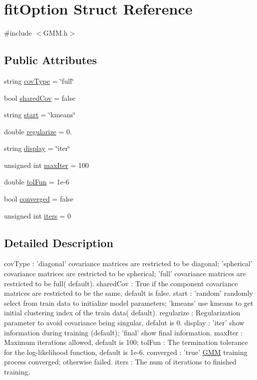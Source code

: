 \hypertarget{structfit_option}{\section{fit\+Option Struct Reference}
\label{structfit_option}
}


{\ttfamily \#include $<$G\+M\+M.\+h$>$}

\subsection*{Public Attributes}
\begin{DoxyCompactItemize}
\item 
string \hyperlink{structfit_option_ae1d880f6fcd26e15f07d50c77c5cceea}{cov\+Type} = \char`\"{}full\char`\"{}
\item 
bool \hyperlink{structfit_option_a2efaf3629539e3864967853058e80420}{shared\+Cov} = false
\item 
string \hyperlink{structfit_option_a4c1ecd5ba984e2e12faa29217c78f931}{start} = \char`\"{}kmeans\char`\"{}
\item 
double \hyperlink{structfit_option_abffa02537679becf07413b31f5889e6f}{regularize} = 0.
\item 
string \hyperlink{structfit_option_acd949efbbb51ddf447d4cb86fd2ac901}{display} = \char`\"{}iter\char`\"{}
\item 
unsigned int \hyperlink{structfit_option_a54d1906ece53c348047c8b404ff06053}{max\+Iter} = 100
\item 
double \hyperlink{structfit_option_a4523efadc5bc4f29cd1648ac4ca018dd}{tol\+Fun} = 1e-\/6
\item 
bool \hyperlink{structfit_option_a600d82e88e845abb5a442f80eecf89cb}{converged} = false
\item 
unsigned int \hyperlink{structfit_option_a711048d488fccee5740b31e4149c46de}{iters} = 0
\end{DoxyCompactItemize}


\subsection{Detailed Description}
cov\+Type \+: 'diagonal' covariance matrices are restricted to be diagonal; 'spherical' covariance matrices are restricted to be spherical; 'full' covariance matrices are restricted to be full( default). shared\+Cov \+: True if the component covariance matrices are restricted to be the same, default is false. start \+: 'random' randomly select from train data to initialize model parameters; 'kmeans' use kmeans to get initial clustering index of the train data( default). regularize \+: Regularization parameter to avoid covariance being singular, defalut is 0. display \+: 'iter' show information during training (default); 'final' show final information. max\+Iter \+: Maximum iterations allowed, default is 100; tol\+Fun \+: The termination tolerance for the log-\/likelihood function, default is 1e-\/6. converged \+: 'true' \hyperlink{class_g_m_m}{G\+M\+M} training process converged; otherwise failed. iters \+: The num of iterations to finished training. 

